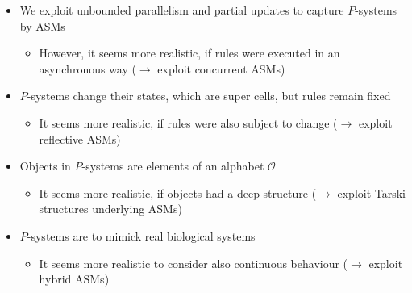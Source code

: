 \documentclass[12pt,landscape]{article}
\begin{document}
\begin{itemize}

\item We exploit unbounded parallelism and partial updates to capture $P$-systems by ASMs

\begin{itemize}

\item However, it seems more realistic, if rules were executed in an asynchronous way ($\rightarrow$ exploit concurrent ASMs)

\end{itemize}

\vfill

\item $P$-systems change their states, which are super cells, but rules remain fixed

\begin{itemize}

\item It seems more realistic, if rules were also subject to change ($\rightarrow$ exploit reflective ASMs)

\end{itemize}

\vfill

\item Objects in $P$-systems are elements of an alphabet $\mathcal{O}$

\begin{itemize}

\item It seems more realistic, if objects had a deep structure ($\rightarrow$ exploit Tarski structures underlying ASMs)

\end{itemize}

\vfill

\item $P$-systems are to mimick real biological systems

\begin{itemize}

\item It seems more realistic to consider also continuous behaviour ($\rightarrow$ exploit hybrid ASMs)

\end{itemize}

\end{itemize}

\vfill

\label{ende}
\end{document}
